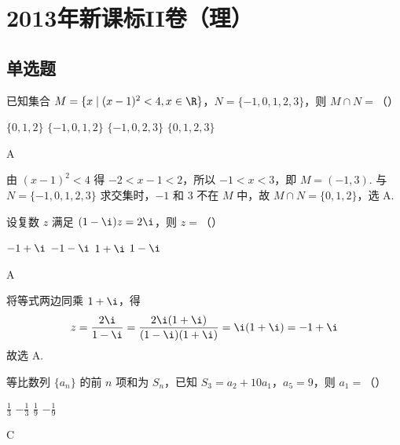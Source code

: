 \chapter{2013年新课标II卷（理）}

\section{单选题}

\begin{problem}
已知集合 \(M = \{x \mid (x - 1)^2 < 4, x \in \R\}\)，\(N = \{-1, 0, 1, 2, 3\}\)，则 \(M \cap N =\)（\quad）

\choices
    {\(\{0, 1, 2\}\)}
    {\(\{-1, 0, 1, 2\}\)}
    {\(\{-1, 0, 2, 3\}\)}
    {\(\{0, 1, 2, 3\}\)}
\end{problem}

\begin{answer}
A
\end{answer}

\begin{solution}
由 \((x-1)^2<4\) 得 \(-2<x-1<2\)，所以 \(-1<x<3\)，即 \(M=(-1,3)\). 与 \(N=\{-1,0,1,2,3\}\) 求交集时，\(-1\) 和 \(3\) 不在 \(M\) 中，故 \(M\cap N=\{0,1,2\}\)，选 A.
\end{solution}

\begin{problem}
设复数 \(z\) 满足 \((1 - \i)z = 2\i\)，则 \(z =\)（\quad）

\choices
    {\(-1 + \i\)}
    {\(-1 - \i\)}
    {\(1 + \i\)}
    {\(1 - \i\)}
\end{problem}

\begin{answer}
A
\end{answer}

\begin{solution}
将等式两边同乘 \(1+\i\)，得
\[
z=\frac{2\i}{1-\i}=\frac{2\i(1+\i)}{(1-\i)(1+\i)}=\i(1+\i)=-1+\i
\]
故选 A.
\end{solution}

\begin{problem}
等比数列 \(\{a_n\}\) 的前 \(n\) 项和为 \(S_n\)，已知 \(S_3 = a_2 + 10a_1\)，\(a_5 = 9\)，则 \(a_1 =\)（\quad）

\choices
    {\(\frac{1}{3}\)}
    {\(-\frac{1}{3}\)}
    {\(\frac{1}{9}\)}
    {\(-\frac{1}{9}\)}
\end{problem}

\begin{answer}
C
\end{answer}

